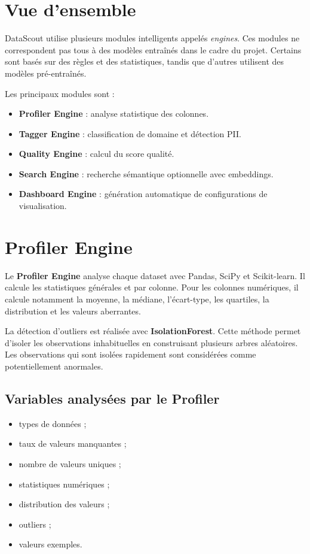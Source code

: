 \documentclass[12pt,a4paper]{report}
\begin{document}
\section{Vue d'ensemble}

DataScout utilise plusieurs modules intelligents appelés \textit{engines}. Ces modules ne correspondent pas tous à des modèles entraînés dans le cadre du projet. Certains sont basés sur des règles et des statistiques, tandis que d'autres utilisent des modèles pré-entraînés.

Les principaux modules sont :

\begin{itemize}
    \item \textbf{Profiler Engine} : analyse statistique des colonnes.
    \item \textbf{Tagger Engine} : classification de domaine et détection PII.
    \item \textbf{Quality Engine} : calcul du score qualité.
    \item \textbf{Search Engine} : recherche sémantique optionnelle avec embeddings.
    \item \textbf{Dashboard Engine} : génération automatique de configurations de visualisation.
\end{itemize}

\section{Profiler Engine}

Le \textbf{Profiler Engine} analyse chaque dataset avec Pandas, SciPy et Scikit-learn. Il calcule les statistiques générales et par colonne. Pour les colonnes numériques, il calcule notamment la moyenne, la médiane, l'écart-type, les quartiles, la distribution et les valeurs aberrantes.

La détection d'outliers est réalisée avec \textbf{IsolationForest}. Cette méthode permet d'isoler les observations inhabituelles en construisant plusieurs arbres aléatoires. Les observations qui sont isolées rapidement sont considérées comme potentiellement anormales.

\subsection{Variables analysées par le Profiler}

\begin{itemize}
    \item types de données ;
    \item taux de valeurs manquantes ;
    \item nombre de valeurs uniques ;
    \item statistiques numériques ;
    \item distribution des valeurs ;
    \item outliers ;
    \item valeurs exemples.
\end{itemize}
\end{document}
